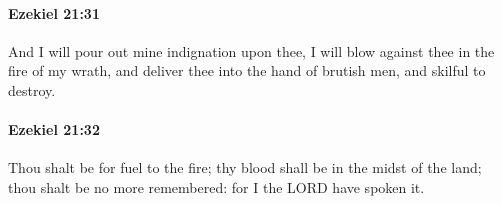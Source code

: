 		\paragraph{Ezekiel 21:31} %
			\label{EZEKIEL-21-31}

			And I will pour out mine indignation upon thee, I will blow against thee in the fire of my wrath, and deliver thee into the hand of brutish men, and skilful to destroy.


		\paragraph{Ezekiel 21:32} %
			\label{EZEKIEL-21-32}

			Thou shalt be for fuel to the fire; thy blood shall be in the midst of the land; thou shalt be no more remembered: for I the LORD have spoken it.

